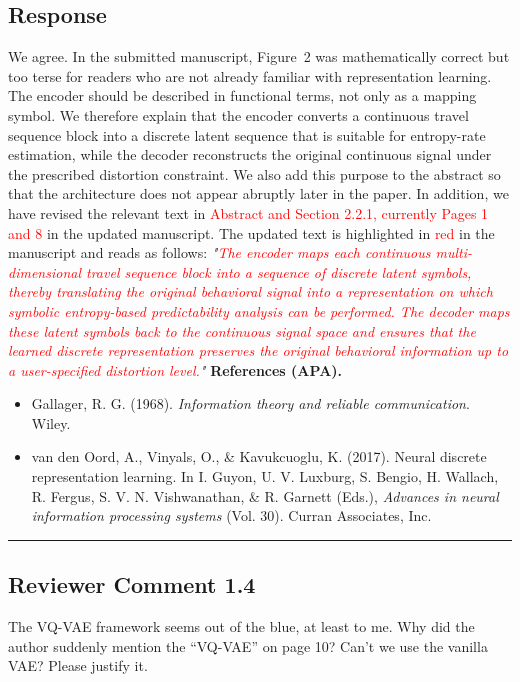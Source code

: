 \documentclass{NSF}
\begin{document}
\subsection{Response}
We agree. In the submitted manuscript, Figure~2 was mathematically correct but too terse for readers who are not already familiar with representation learning. The encoder should be described in functional terms, not only as a mapping symbol. We therefore explain that the encoder converts a continuous travel sequence block into a discrete latent sequence that is suitable for entropy-rate estimation, while the decoder reconstructs the original continuous signal under the prescribed distortion constraint. We also add this purpose to the abstract so that the architecture does not appear abruptly later in the paper.
\noindent In addition, we have revised the relevant text in \textcolor{red}{Abstract and Section 2.2.1, currently Pages 1 and 8} in the updated manuscript. The updated text is highlighted in \textcolor{red}{red} in the manuscript and reads as follows:
\vskip 0.1cm
\noindent \textit{"\textcolor{red}{The encoder maps each continuous multi-dimensional travel sequence block into a sequence of discrete latent symbols, thereby translating the original behavioral signal into a representation on which symbolic entropy-based predictability analysis can be performed. The decoder maps these latent symbols back to the continuous signal space and ensures that the learned discrete representation preserves the original behavioral information up to a user-specified distortion level.}"}
\vskip 0.05in
\noindent\textbf{References (APA).}
\begin{itemize}
    \item Gallager, R. G. (1968). \textit{Information theory and reliable communication}. Wiley.
    \item van den Oord, A., Vinyals, O., \& Kavukcuoglu, K. (2017). Neural discrete representation learning. In I. Guyon, U. V. Luxburg, S. Bengio, H. Wallach, R. Fergus, S. V. N. Vishwanathan, \& R. Garnett (Eds.), \textit{Advances in neural information processing systems} (Vol. 30). Curran Associates, Inc.
\end{itemize}

\noindent\rule{16.5cm}{1.0pt}

\subsection{Reviewer Comment 1.4}
\begin{mdframed}
The VQ-VAE framework seems out of the blue, at least to me. Why did the author suddenly mention the ``VQ-VAE'' on page 10? Can't we use the vanilla VAE? Please justify it.
\end{mdframed}
\end{document}
